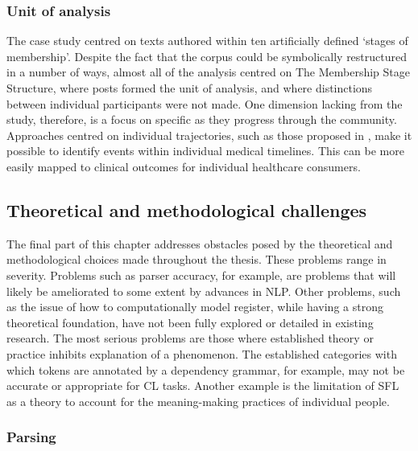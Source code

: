 \subsubsection*{Unit of analysis}

The case study centred on texts authored within ten artificially defined `stages of membership'. Despite the fact that the \gls{corpus} could be symbolically restructured in a number of ways, almost all of the analysis centred on The Membership Stage Structure, where \glspl{post} formed the unit of analysis, and where distinctions between individual participants were not made. One dimension lacking from the study, therefore, is a focus on specific  as they progress through the community. Approaches centred on individual  trajectories, such as those proposed in \textcite{chancellor_recovery_2016,chancellor_this_2016,maclean_forum77:_2015}, make it possible to identify events within individual medical timelines. This can be more easily mapped to clinical outcomes for individual healthcare consumers.

\subsection{Theoretical and methodological challenges}

The final part of this chapter addresses obstacles posed by the theoretical and methodological choices made throughout the thesis. These problems range in severity. Problems such as parser accuracy, for example, are problems that will likely be ameliorated to some extent by advances in \gls{NLP}. Other problems, such as the issue of how to computationally model register, while having a strong theoretical foundation, have not been fully explored or detailed in existing research. The most serious problems are those where established theory or practice inhibits explanation of a phenomenon. The established categories with which tokens are annotated by a dependency grammar, for example, may not be accurate or appropriate for \gls{CL} tasks. Another example is the limitation of \gls{SFL} as a theory to account for the meaning\hyp{}making practices of individual people.

\subsubsection{Parsing}


